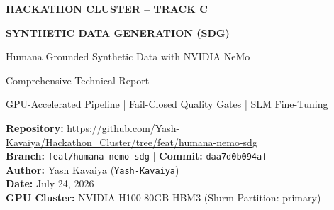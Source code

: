 \documentclass[11pt,a4paper]{article}
\begin{document}
\begin{titlepage}
    \centering
    \vspace*{2cm}
    
    
    \vspace{1.5cm}
    
    {\huge\bfseries\color{nvidiaText} HACKATHON CLUSTER -- TRACK C\par}
    \vspace{0.5cm}
    {\LARGE\bfseries\color{nvidiaGreen} SYNTHETIC DATA GENERATION (SDG)\par}
    \vspace{0.3cm}
    {\Large\color{nvidiaBlue} Humana Grounded Synthetic Data with NVIDIA NeMo\par}
    
    \vspace{2cm}
    
    {\large\color{nvidiaText} Comprehensive Technical Report\par}
    {\large\color{nvidiaTextLight} GPU-Accelerated Pipeline | Fail-Closed Quality Gates | SLM Fine-Tuning\par}
    
    \vspace{2cm}
    
    \begin{tcolorbox}[
        colback=nvidiaOffWhite,
        colframe=nvidiaGreen,
        width=0.8\linewidth,
        arc=5pt,
        boxrule=1.5pt
    ]
    \centering
    {\color{nvidiaText}\Large\textbf{Repository:} \url{https://github.com/Yash-Kavaiya/Hackathon_Cluster/tree/feat/humana-nemo-sdg}}\\
    \vspace{0.3cm}
    {\color{nvidiaText}\textbf{Branch:} \texttt{feat/humana-nemo-sdg} | \textbf{Commit:} \texttt{daa7d0b094af}}\\
    \vspace{0.3cm}
    {\color{nvidiaText}\textbf{Author:} Yash Kavaiya (\texttt{Yash-Kavaiya})}\\
    \vspace{0.3cm}
    {\color{nvidiaText}\textbf{Date:} July 24, 2026}\\
    \vspace{0.3cm}
    {\color{nvidiaText}\textbf{GPU Cluster:} NVIDIA H100 80GB HBM3 (Slurm Partition: primary)}
    \end{tcolorbox}
    

\end{titlepage}
\end{document}
